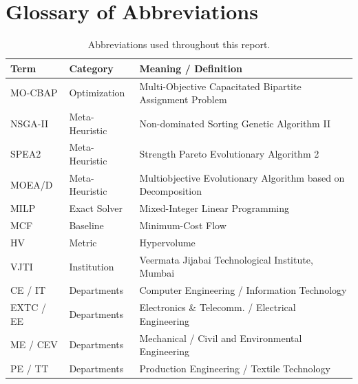 \documentclass[11pt,a4paper,oneside]{report}
\begin{document}
\chapter{Glossary of Abbreviations}
\begin{table}[htbp]
\centering
\caption{Abbreviations used throughout this report.}
\label{tab:abbreviations}
\begin{tabularx}{\textwidth}{llX}
\toprule
\textbf{Term} & \textbf{Category} & \textbf{Meaning / Definition} \\
\midrule
MO-CBAP & Optimization & Multi-Objective Capacitated Bipartite Assignment Problem \\
NSGA-II & Meta-Heuristic & Non-dominated Sorting Genetic Algorithm II \\
SPEA2 & Meta-Heuristic & Strength Pareto Evolutionary Algorithm 2 \\
MOEA/D & Meta-Heuristic & Multiobjective Evolutionary Algorithm based on Decomposition \\
MILP & Exact Solver & Mixed-Integer Linear Programming \\
MCF & Baseline & Minimum-Cost Flow \\
HV & Metric & Hypervolume \\
VJTI & Institution & Veermata Jijabai Technological Institute, Mumbai \\
CE / IT & Departments & Computer Engineering / Information Technology \\
EXTC / EE & Departments & Electronics \& Telecomm. / Electrical Engineering \\
ME / CEV & Departments & Mechanical / Civil and Environmental Engineering \\
PE / TT & Departments & Production Engineering / Textile Technology \\
\bottomrule
\end{tabularx}
\end{table}
\end{document}
